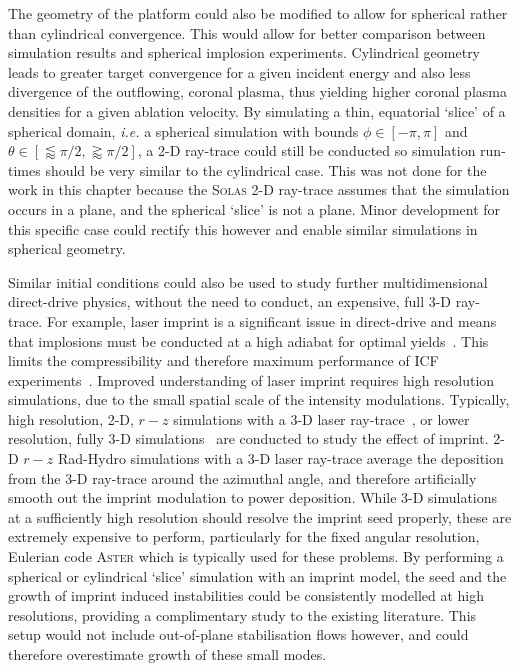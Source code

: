 The geometry of the platform could also be modified to allow for spherical rather than cylindrical convergence.
This would allow for better comparison between simulation results and spherical implosion experiments.
Cylindrical geometry leads to greater target convergence for a given incident energy and also less divergence of the outflowing, coronal plasma, thus yielding higher coronal plasma densities for a given ablation velocity.
By simulating a thin, equatorial `slice' of a spherical domain, \textit{i.e.} a spherical simulation with bounds $\phi\in[-\pi,\pi]$ and $\theta\in\left[\lessapprox\pi/2,\gtrapprox\pi/2\right]$, a 2-D ray-trace could still be conducted so simulation run-times should be very similar to the cylindrical case.
This was not done for the work in this chapter because the \textsc{Solas} 2-D ray-trace assumes that the simulation occurs in a plane, and the spherical `slice' is not a plane.
Minor development for this specific case could rectify this however and enable similar simulations in spherical geometry.

Similar initial conditions could also be used to study further multidimensional direct-drive physics, without the need to conduct, an expensive, full 3-D ray-trace.
For example, laser imprint is a significant issue in direct-drive and means that implosions must be conducted at a high adiabat for optimal yields~\cite{patel_effects_2023}.
This limits the compressibility and therefore maximum performance of \ac{ICF} experiments~\cite{dittrich_design_2014,robey_performance_2016}.
Improved understanding of laser imprint requires high resolution simulations, due to the small spatial scale of the intensity modulations.
Typically, high resolution, 2-D, $r-z$ simulations with a 3-D laser ray-trace~\cite{hu_directdrive_2019}, or lower resolution, fully 3-D simulations~\cite{igumenshchev_rarefaction_2019} are conducted to study the effect of imprint.
2-D $r-z$ \ac{Rad-Hydro} simulations with a 3-D laser ray-trace average the deposition from the 3-D ray-trace around the azimuthal angle, and therefore artificially smooth out the imprint modulation to power deposition.
While 3-D simulations at a sufficiently high resolution should resolve the imprint seed properly, these are extremely expensive to perform, particularly for the fixed angular resolution, Eulerian code \textsc{Aster} which is typically used for these problems.
By performing a spherical or cylindrical `slice' simulation with an imprint model, the seed and the growth of imprint induced instabilities could be consistently modelled at high resolutions, providing a complimentary study to the existing literature.
This setup would not include out-of-plane stabilisation flows however, and could therefore overestimate growth of these small modes.
